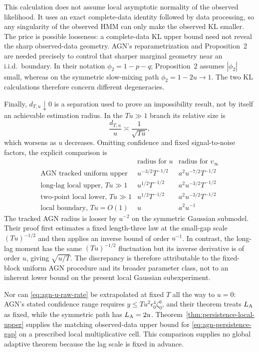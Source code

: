 This calculation does not assume local asymptotic normality of the observed
likelihood.  It uses an exact complete-data identity followed by data
processing, so any singularity of the observed HMM can only make the observed
KL smaller.  The price is possible looseness: a complete-data KL upper bound
need not reveal the sharp observed-data geometry.  AGN's reparametrization and
Proposition~2 are needed precisely to control that sharper marginal geometry
near an i.i.d.\ boundary.  In their notation
\(\phi_2=1-p-q\); Proposition~2 assumes \(|\phi_2|\) small, whereas on the
symmetric slow-mixing path \(\phi_2=1-2u\to1\).  The two KL calculations
therefore concern different degeneracies.

Finally, \(d_{T,u}\downarrow0\) is a separation used to prove an impossibility
result, not by itself an achievable estimation radius.  In the \(Tu\gg1\)
branch its relative size is
\[
 \frac{d_{T,u}}u
 \asymp\frac1{\sqrt{Tu}},
\]
which worsens as \(u\) decreases.  Omitting confidence and fixed
signal-to-noise factors, the explicit comparison is
\[
 \begin{array}{c|c|c}
 &\text{radius for }u&\text{radius for }v_\infty\\\hline
 \text{AGN tracked uniform upper}
 &u^{-3/2}T^{-1/2}&a^2u^{-7/2}T^{-1/2}\\
 \text{long-lag local upper, }Tu\gg1
 &u^{1/2}T^{-1/2}&a^2u^{-3/2}T^{-1/2}\\
 \text{two-point local lower, }Tu\gg1
 &u^{1/2}T^{-1/2}&a^2u^{-3/2}T^{-1/2}\\
 \text{local boundary, }Tu=O(1)
 &u&a^2u^{-1}
 \end{array}
\]
The tracked AGN radius is looser by \(u^{-2}\) on the symmetric Gaussian
submodel.  Their proof first estimates a fixed length-three law at the
small-gap scale \((Tu)^{-1/2}\) and then applies an inverse bound of order
\(u^{-1}\).  In contrast, the long-lag moment has the same
\((Tu)^{-1/2}\) fluctuation but its inverse derivative is of order \(u\),
giving \(\sqrt{u/T}\).  The discrepancy is therefore attributable to the
fixed-block uniform AGN procedure and its broader parameter class, not to an
inherent lower bound on the present local Gaussian subexperiment.

Nor can \eqref{eq:agn-u-raw-rate} be extrapolated at fixed \(T\) all the way
to \(u=0\): AGN's stated confidence range requires
\(y\leq T u^2\epsilon_0^4\zeta_0^6\), and their theorem treats
\(L_{\rm A}\) as fixed, while the symmetric path has \(L_{\rm A}=2u\).
Theorem~\ref{thm:persistence-local-upper} supplies the matching observed-data
upper bound for \eqref{eq:agn-persistence-gap} on a prescribed local
multiplicative cell.  This comparison supplies no global adaptive theorem
because the lag scale is fixed in advance.

